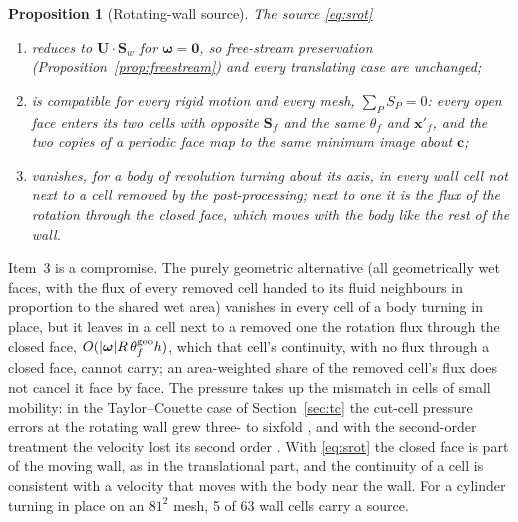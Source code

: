 \documentclass[11pt,a4paper]{article}
\newtheorem{proposition}{Proposition}
\theoremstyle{remark}
\newcommand{\xx}{\bm{x}}
\newcommand{\Sf}{\bm{S}_f}
\newcommand{\Sw}{\bm{S}_w}
\begin{document}
\begin{proposition}[Rotating-wall source]
\label{prop:srot}
The source \eqref{eq:srot}
\begin{enumerate}\itemsep1pt
\item reduces to $\bm U\cdot\Sw$ for $\bm\omega=\bm 0$, so free-stream preservation
      (Proposition~\ref{prop:freestream}) and every translating case are unchanged;
\item is compatible for every rigid motion and every mesh, $\sum_PS_P=0$: every open face
      enters its two cells with opposite $\Sf$ and the same $\theta_f$ and $\xx'_f$, and the two
      copies of a periodic face map to the same minimum image about $\bm c$;
\item vanishes, for a body of revolution turning about its axis, in every wall cell not next to
      a cell removed by the post-processing; next to one it is the flux of the rotation through
      the closed face, which moves with the body like the rest of the wall.
\end{enumerate}
\end{proposition}

\noindent Item~3 is a compromise. The purely geometric alternative (all geometrically wet faces,
with the flux of every removed cell handed to its fluid neighbours in proportion to the shared
wet area) vanishes in every cell of a body turning in place, but it leaves in a cell next to a
removed one the rotation flux through the closed face, $O(|\bm\omega|R\,\theta^{\rm geo}_fh)$,
which that cell's continuity, with no flux through a closed face, cannot carry; an area-weighted
share of the removed cell's flux does not cancel it face by face. The pressure takes up the
mismatch in cells of small mobility: in the Taylor--Couette case of
Section~\ref{sec:tc}
the cut-cell pressure errors at the rotating wall grew three- to sixfold%
, and with the second-order treatment the velocity lost its second order%
. With \eqref{eq:srot} the closed face is part of the moving wall, as in the translational part,
and the continuity of a cell is consistent with a velocity that moves with the body near the
wall. For a cylinder turning in place on an $81^2$ mesh, 5 of 63 wall cells carry a source.
\end{document}
